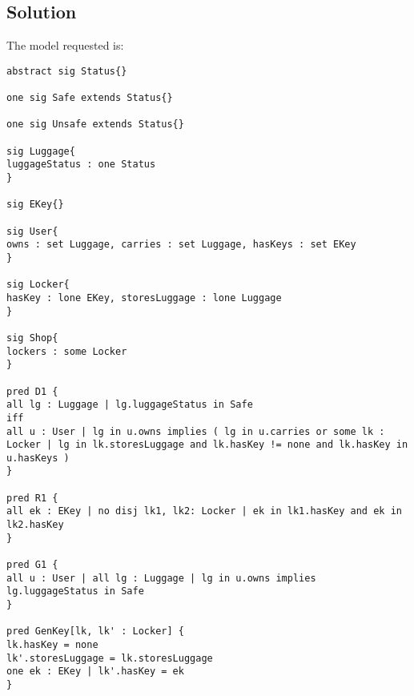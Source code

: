\subsection*{Solution}
The model requested is: 
\begin{lstlisting}[language=alloy]
abstract sig Status{}

one sig Safe extends Status{} 

one sig Unsafe extends Status{}

sig Luggage{
luggageStatus : one Status
}

sig EKey{}

sig User{
owns : set Luggage, carries : set Luggage, hasKeys : set EKey
}

sig Locker{
hasKey : lone EKey, storesLuggage : lone Luggage
}

sig Shop{
lockers : some Locker
}

pred D1 {
all lg : Luggage | lg.luggageStatus in Safe 
iff 
all u : User | lg in u.owns implies ( lg in u.carries or some lk : Locker | lg in lk.storesLuggage and lk.hasKey != none and lk.hasKey in u.hasKeys )
}

pred R1 {
all ek : EKey | no disj lk1, lk2: Locker | ek in lk1.hasKey and ek in lk2.hasKey
}

pred G1 {
all u : User | all lg : Luggage | lg in u.owns implies lg.luggageStatus in Safe
}

pred GenKey[lk, lk' : Locker] {
lk.hasKey = none
lk'.storesLuggage = lk.storesLuggage
one ek : EKey | lk'.hasKey = ek 
}
\end{lstlisting}